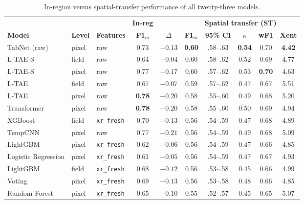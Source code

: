 \documentclass[journal]{IEEEtran}
\begin{document}
\begin{table}[!t]
\centering
\caption{In-region versus spatial-transfer performance of all twenty-three models.}
\label{tab:gap}
\scriptsize
\renewcommand{\arraystretch}{1.1}
\setlength{\tabcolsep}{4pt}
\begin{tabular}{lllccccccc}
\toprule
 & & & \textbf{In-reg} & & \multicolumn{5}{c}{\textbf{Spatial transfer (ST)}} \\
\cmidrule(lr){4-4}\cmidrule(lr){6-10}
\textbf{Model} & \textbf{Level} & \textbf{Features} & \textbf{F1$_m$} & \textbf{$\Delta$} & \textbf{F1$_m$} & \textbf{95\% CI} & \textbf{$\kappa$} & \textbf{wF1} & \textbf{Xent} \\
\midrule
TabNet (raw)          & pixel & raw & 0.73 & $-0.13$ & \textbf{0.60} & .58--.63 & \textbf{0.54} & 0.70 & \textbf{4.42} \\
L-TAE-S               & field & raw & 0.64 & $\mathbf{-0.04}$ & 0.60 & .58--.62 & 0.52 & 0.69 & 4.77 \\
L-TAE-S               & pixel & raw & 0.77 & $-0.17$ & 0.60 & .57--.62 & 0.53 & \textbf{0.70} & 4.63 \\
L-TAE                 & field & raw & 0.67 & $-0.07$ & 0.59 & .57--.62 & 0.47 & 0.67 & 5.51 \\
L-TAE                 & pixel & raw & \textbf{0.78} & $-0.20$ & 0.58 & .55--.60 & 0.49 & 0.68 & 5.20 \\
Transformer           & pixel & raw & \textbf{0.78} & $-0.20$ & 0.58 & .55--.60 & 0.50 & 0.69 & 4.94 \\
XGBoost               & field & \texttt{xr\_fresh} & 0.70 & $-0.13$ & 0.56 & .54--.59 & 0.47 & 0.68 & 4.89 \\
TempCNN               & pixel & raw & 0.77 & $-0.21$ & 0.56 & .54--.59 & 0.49 & 0.68 & 5.09 \\
LightGBM              & pixel & \texttt{xr\_fresh} & 0.62 & $-0.06$ & 0.56 & .54--.59 & 0.47 & 0.66 & 4.85 \\
Logistic Regression   & pixel & \texttt{xr\_fresh} & 0.61 & $-0.05$ & 0.56 & .54--.59 & 0.47 & 0.67 & 4.93 \\
LightGBM              & field & \texttt{xr\_fresh} & 0.68 & $-0.12$ & 0.56 & .53--.58 & 0.45 & 0.66 & 4.99 \\
Voting                & pixel & \texttt{xr\_fresh} & 0.69 & $-0.13$ & 0.56 & .53--.58 & 0.48 & 0.66 & 4.85 \\
Random Forest         & pixel & \texttt{xr\_fresh} & 0.65 & $-0.10$ & 0.55 & .52--.57 & 0.45 & 0.65 & 5.07 \\

\end{tabular}
\end{table}
\end{document}
